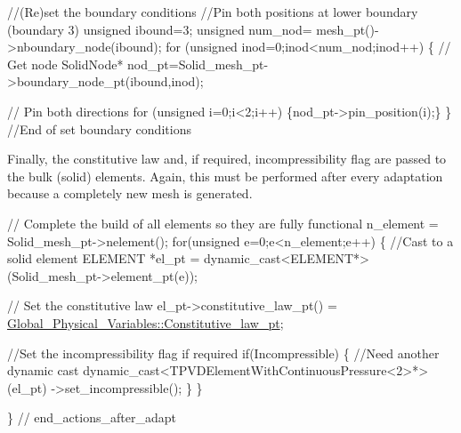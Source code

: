 \begin{DoxyCodeInclude}
 
 \textcolor{comment}{//(Re)set the boundary conditions}
 \textcolor{comment}{//Pin both positions at lower boundary (boundary 3)}
 \textcolor{keywordtype}{unsigned} ibound=3;
 \textcolor{keywordtype}{unsigned} num\_nod= mesh\_pt()->nboundary\_node(ibound);
 \textcolor{keywordflow}{for} (\textcolor{keywordtype}{unsigned} inod=0;inod<num\_nod;inod++)
  \{  
   \textcolor{comment}{// Get node}
   SolidNode* nod\_pt=Solid\_mesh\_pt->boundary\_node\_pt(ibound,inod);
   
   \textcolor{comment}{// Pin both directions}
   \textcolor{keywordflow}{for} (\textcolor{keywordtype}{unsigned} i=0;i<2;i++) \{nod\_pt->pin\_position(i);\}
  \}
 \textcolor{comment}{//End of set boundary conditions }

\end{DoxyCodeInclude}


Finally, the constitutive law and, if required, incompressibility flag are passed to the bulk (solid) elements. Again, this must be performed after every adaptation because a completely new mesh is generated.


\begin{DoxyCodeInclude}
 
 \textcolor{comment}{// Complete the build of all elements so they are fully functional}
 n\_element = Solid\_mesh\_pt->nelement();
 \textcolor{keywordflow}{for}(\textcolor{keywordtype}{unsigned} e=0;e<n\_element;e++)
  \{
   \textcolor{comment}{//Cast to a solid element}
   ELEMENT *el\_pt = \textcolor{keyword}{dynamic\_cast<}ELEMENT*\textcolor{keyword}{>}(Solid\_mesh\_pt->element\_pt(e));
   
   \textcolor{comment}{// Set the constitutive law}
   el\_pt->constitutive\_law\_pt() =
    \hyperlink{namespaceGlobal__Physical__Variables_a2a37fb040c832ee7a086bb13bb02a100}{Global\_Physical\_Variables::Constitutive\_law\_pt};
   
   \textcolor{comment}{//Set the incompressibility flag if required}
   \textcolor{keywordflow}{if}(Incompressible) 
    \{
     \textcolor{comment}{//Need another dynamic cast}
     \textcolor{keyword}{dynamic\_cast<}TPVDElementWithContinuousPressure<2>*\textcolor{keyword}{>}(el\_pt)
      ->set\_incompressible();
    \}
  \}

\} \textcolor{comment}{// end\_actions\_after\_adapt}

\end{DoxyCodeInclude}




